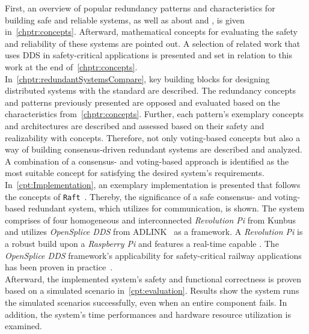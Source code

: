 First, an overview of popular redundancy patterns and characteristics for building safe and reliable systems, as well as about  and , is given in~\autoref{chptr:concepts}.
Afterward, mathematical concepts for evaluating the safety and reliability of these systems are pointed out.
A selection of related work that uses \gls{DDS} in safety-critical applications is presented and set in relation to this work at the end of~\autoref{chptr:concepts}.
\\

In~\autoref{chptr:redundantSystemsCompare}, key building blocks for designing distributed systems with the  standard are described.
The redundancy concepts and patterns previously presented are opposed and evaluated based on the characteristics from~\autoref{chptr:concepts}.
Further, each pattern's exemplary concepts and architectures are described and assessed based on their safety and realizability with  concepts.
Therefore, not only voting-based concepts but also a way of building consensus-driven redundant systems are described and analyzed.
A combination of a consensus- and voting-based approach is identified as the most suitable concept for satisfying the desired system's requirements.
\\

In~\autoref{cpt:Implementation}, an exemplary implementation is presented that follows the concepts of \texttt{Raft}~\cite{RaftConsensusPaper}.
Thereby, the significance of a safe consensus- and voting-based redundant system, which utilizes  for communication, is shown.
The system comprises of four homogeneous and interconnected \textit{Revolution Pi} from Kunbus~\cite{Kunbus} and utilizes \textit{OpenSplice DDS} from ADLINK~\cite{VortexOpenSplice} as a  framework.
A \textit{Revolution Pi} is a robust  build upon a \textit{Raspberry Pi} and features a real-time capable .
The \textit{OpenSplice DDS} framework's applicability for safety-critical railway applications has been proven in practice~\cite{SchmidtMissionCriticalChallenges}.
\\

Afterward, the implemented system's safety and functional correctness is proven based on a simulated  scenario in~\autoref{cpt:evaluation}.
Results show the system runs the simulated scenarios successfully, even when an entire component fails.
In addition, the system's time performances and hardware resource utilization is examined.



